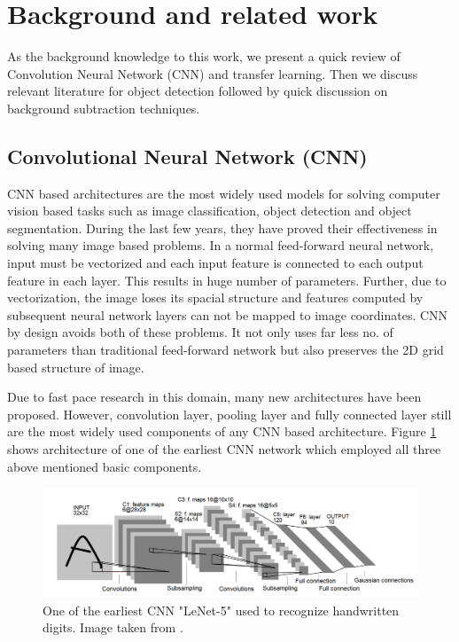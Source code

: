 \section{Background and related work}
As the background knowledge to this work, we present a quick review of Convolution Neural Network (CNN) and transfer learning. Then we discuss relevant literature for object detection followed by quick discussion on background subtraction techniques. 


\subsection{Convolutional Neural Network (CNN)}
CNN based architectures are the most widely used models for solving computer vision based tasks such as image classification, object detection and object segmentation. During the last few years, they have proved their effectiveness in solving many image based problems. In a normal feed-forward neural network, input must be vectorized and each input feature is connected to each output feature in each layer. This results in huge number of parameters. Further, due to vectorization, the image loses its spacial structure and features computed by subsequent neural network layers can not be mapped to image coordinates. CNN by design avoids both of these problems. It not only uses far less no. of parameters than traditional feed-forward network but also preserves the 2D grid based structure of image\cite{arkar_thesis}.

Due to fast pace research in this domain, many new architectures have been proposed. However, convolution layer, pooling layer and fully connected layer still are the most widely used components of any CNN based architecture. Figure \ref{fig:lenet-5} shows architecture of one of the earliest CNN network which employed all three above mentioned basic components. 

\begin{figure}
    \centering
    \includegraphics[width=\linewidth]{images/lenet-5.PNG}
    \caption[LeNet-5]{One of the earliest CNN "LeNet-5" used to  recognize handwritten
digits. Image taken from \cite{lecun1998gradient}.}
    \label{fig:lenet-5}
\end{figure}


